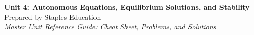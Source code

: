 




\begin{center}
    {\LARGE \bfseries Unit 4: Autonomous Equations, Equilibrium Solutions, and Stability}\\[6pt]
    {\large Prepared by Staples Education}\\[4pt]
    {\itshape Master Unit Reference Guide: Cheat Sheet, Problems, and Solutions}
\end{center}

\vspace{0.4em}

\tableofcontents

\vspace{0.4em}

